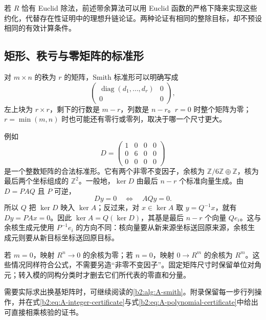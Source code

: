 若 \(R\) 恰有 Euclid 除法，前述带余算法可以用 Euclid 函数的严格下降来实现这些约化，代替存在性证明中的理想升链论证。两种论证有相同的整除目标，却不预设相同的有效计算条件。

\subsection{矩形、秩亏与零矩阵的标准形}
\label{b2:subsec:0401:05}

对 \(m\times n\) 的秩为 \(r\) 的矩阵，Smith 标准形可以明确写成
\[
	\begin{pmatrix}
		\operatorname{diag}(d_1,\ldots,d_r)&0\\
		0&0
	\end{pmatrix},
\]
左上块为 \(r\times r\)，剩下的行数是 \(m-r\)，列数是 \(n-r\)。\(r=0\) 时整个矩阵为零；\(r=\min(m,n)\) 时也可能还有零行或零列，取决于哪一个尺寸更大。

\ProseParagraphBreak
例如
\[
	D=\begin{pmatrix}1&0&0&0\\0&6&0&0\\0&0&0&0\end{pmatrix}
\]
是一个整数矩阵的合法标准形。它有两个非零不变因子，余核为 \(\mathbb Z/6\mathbb Z\oplus\mathbb Z\)，核为最后两个坐标组成的 \(\mathbb Z^2\)。一般地，\(\ker D\) 由最后 \(n-r\) 个标准向量生成。由 \(D=PAQ\) 且 \(P\) 可逆，
\[
	Dy=0\quad\Longleftrightarrow\quad AQy=0.
\]
所以 \(Q\) 把 \(\ker D\) 映入 \(\ker A\)；反过来，对 \(x\in\ker A\) 取 \(y=Q^{-1}x\)，就有 \(Dy=PAx=0\)。因此 \(\ker A=Q(\ker D)\)，其基是最后 \(n-r\) 个向量 \(Qe_i\)。这与余核生成元使用 \(P^{-1}e_i\) 的方向不同：核向量要从新来源坐标送回原来源，余核生成元则要从新目标坐标送回原目标。

\ProseParagraphBreak
若 \(m=0\)，映射 \(R^n\to0\) 的余核为零；若 \(n=0\)，映射 \(0\to R^m\) 的余核为 \(R^m\)。这些情况同样符合公式，不需要另造“非零不变因子”。固定矩阵尺寸时保留单位对角元；转入模的同构分类时才删去它们所代表的零直和分量。

\ProseParagraphBreak
需要实际求出换基矩阵时，可继续阅读的\cref{b2:alg:A-smith}。附录保留每一步行列操作，并在式\eqref{b2:eq:A-integer-certificate}与式\eqref{b2:eq:A-polynomial-certificate}中给出可直接相乘核验的证书。
